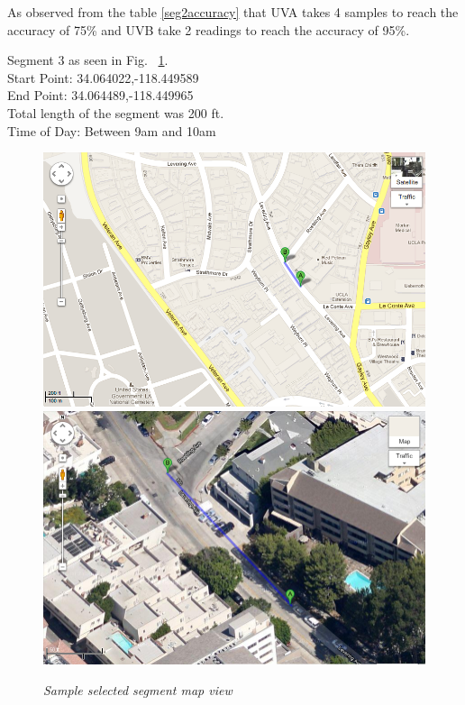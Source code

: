 \documentclass[12pt,fullpage,doublespace]{article}
\begin{document}
As observed from the table \ref{seg2accuracy} that UVA takes 4 samples to reach the accuracy of 75\% and UVB take 2 readings to reach the accuracy of 95\%. 
\newpage\newpage
\begin{center}
Segment 3 as seen in Fig. ~\ref{fig:segment3}. \\
Start Point: 34.064022,-118.449589\\
End Point:  34.064489,-118.449965 \\
Total length of the segment was 200 ft.\\
Time of Day: Between 9am and 10am\\
\begin{figure}[h]
\begin{center}
\includegraphics[scale=0.32]{segment3a.png}
\includegraphics[scale=0.32]{segment3b.png}
\caption{\small \sl Sample selected segment map view}\label{fig:segment3}
\end{center}
\end{figure}
\end{center}
\end{document}
